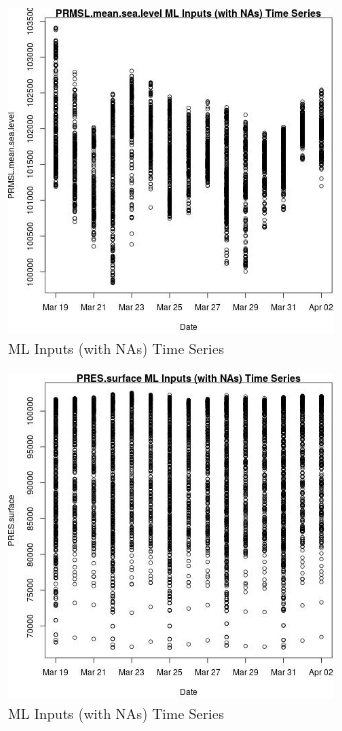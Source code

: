 \begin{figure} 
\centering  
\includegraphics[width=0.77\textwidth]{Code_Outputs/Report_ML_input_PM25_Step4_part_e_de_duplicated_aveswNAs_PRMSLmeansealevelvDate.jpg} 
\caption{\label{fig:Report_ML_input_PM25_Step4_part_e_de_duplicated_aveswNAsPRMSLmeansealevelvDate}ML Inputs (with NAs) Time Series} 
\end{figure} 
 

\begin{figure} 
\centering  
\includegraphics[width=0.77\textwidth]{Code_Outputs/Report_ML_input_PM25_Step4_part_e_de_duplicated_aveswNAs_PRESsurfacevDate.jpg} 
\caption{\label{fig:Report_ML_input_PM25_Step4_part_e_de_duplicated_aveswNAsPRESsurfacevDate}ML Inputs (with NAs) Time Series} 
\end{figure} 
 

